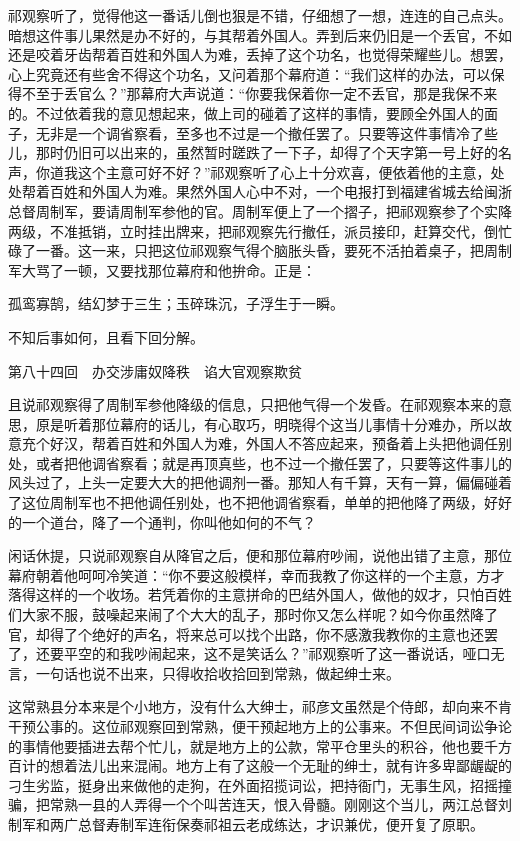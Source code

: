 \documentclass[12pt,UTF8]{ctexbook}
\begin{document}
{{{祁观察听了，觉得他这一番话儿倒也狠是不错，仔细想了一想，连连的自己点头。暗想这件事儿果然是办不好的，与其帮着外国人。弄到后来仍旧是一个丢官，不如还是咬着牙齿帮着百姓和外国人为难，丢掉了这个功名，也觉得荣耀些儿。想罢，心上究竟还有些舍不得这个功名，又问着那个幕府道：“我们这样的办法，可以保得不至于丢官么？”那幕府大声说道：“你要我保着你一定不丢官，那是我保不来的。不过依着我的意见想起来，做上司的碰着了这样的事情，要顾全外国人的面子，无非是一个调省察看，至多也不过是一个撤任罢了。只要等这件事情冷了些儿，那时仍旧可以出来的，虽然暂时蹉跌了一下子，却得了个天字第一号上好的名声，你道我这个主意可好不好？”祁观察听了心上十分欢喜，便依着他的主意，处处帮着百姓和外国人为难。果然外国人心中不对，一个电报打到福建省城去给闽浙总督周制军，要请周制军参他的官。周制军便上了一个摺子，把祁观察参了个实降两级，不准抵销，立时挂出牌来，把祁观察先行撤任，派员接印，赶算交代，倒忙碌了一番。这一来，只把这位祁观察气得个脑胀头昏，要死不活拍着桌子，把周制军大骂了一顿，又要找那位幕府和他拚命。正是：

孤鸾寡鹄，结幻梦于三生；玉碎珠沉，子浮生于一瞬。

不知后事如何，且看下回分解。





第八十四回　办交涉庸奴降秩　谄大官观察欺贫





且说祁观察得了周制军参他降级的信息，只把他气得一个发昏。在祁观察本来的意思，原是听着那位幕府的话儿，有心取巧，明晓得个这当儿事情十分难办，所以故意充个好汉，帮着百姓和外国人为难，外国人不答应起来，预备着上头把他调任别处，或者把他调省察看；就是再顶真些，也不过一个撤任罢了，只要等这件事儿的风头过了，上头一定要大大的把他调剂一番。那知人有千算，天有一算，偏偏碰着了这位周制军也不把他调任别处，也不把他调省察看，单单的把他降了两级，好好的一个道台，降了一个通判，你叫他如何的不气？

闲话休提，只说祁观察自从降官之后，便和那位幕府吵闹，说他出错了主意，那位幕府朝着他呵呵冷笑道：“你不要这般模样，幸而我教了你这样的一个主意，方才落得这样的一个收场。若凭着你的主意拼命的巴结外国人，做他的奴才，只怕百姓们大家不服，鼓噪起来闹了个大大的乱子，那时你又怎么样呢？如今你虽然降了官，却得了个绝好的声名，将来总可以找个出路，你不感激我教你的主意也还罢了，还要平空的和我吵闹起来，这不是笑话么？”祁观察听了这一番说话，哑口无言，一句话也说不出来，只得收拾收拾回到常熟，做起绅士来。

这常熟县分本来是个小地方，没有什么大绅士，祁彦文虽然是个侍郎，却向来不肯干预公事的。这位祁观察回到常熟，便干预起地方上的公事来。不但民间词讼争论的事情他要插进去帮个忙儿，就是地方上的公款，常平仓里头的积谷，他也要千方百计的想着法儿出来混闹。地方上有了这般一个无耻的绅士，就有许多卑鄙龌龊的刁生劣监，挺身出来做他的走狗，在外面招揽词讼，把持衙门，无事生风，招摇撞骗，把常熟一县的人弄得一个个叫苦连天，恨入骨髓。刚刚这个当儿，两江总督刘制军和两广总督寿制军连衔保奏祁祖云老成练达，才识兼优，便开复了原职。

}}}
\end{document}
